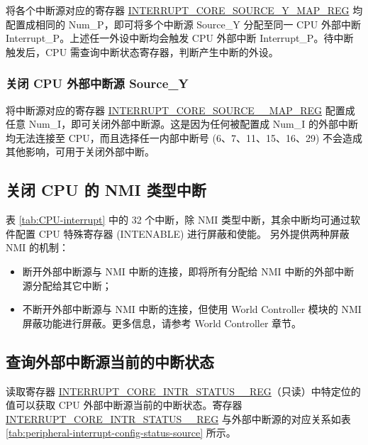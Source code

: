 \documentclass[main\_\_CN.tex]{subfiles}
\begin{document}
将各个中断源对应的寄存器 \hyperref[regdesc:INTERRUPTCORE0CACHECORE1ACSINTMAPREG]{INTERRUPT\_CORE\_SOURCE\_Y\_MAP\_REG} 均配置成相同的 Num\_P，即可将多个中断源 Source\_Y 分配至同一 CPU 外部中断 Interrupt\_P。上述任一外设中断均会触发 CPU 外部中断 Interrupt\_P。待中断触发后，CPU 需查询中断状态寄存器，判断产生中断的外设。

\subsubsection{关闭 CPU 外部中断源 Source\_Y}

将中断源对应的寄存器 \hyperref[regdesc:INTERRUPTCORE0CACHECORE1ACSINTMAPREG]{INTERRUPT\_CORE\_SOURCE\_\_MAP\_REG} 配置成任意 Num\_I，即可关闭外部中断源。这是因为任何被配置成 Num\_I 的外部中断均无法连接至 CPU，而且选择任一内部中断号 (6、7、11、15、16、29) 不会造成其他影响，可用于关闭外部中断。

\subsection{关闭 CPU 的 NMI 类型中断}

表 \ref{tab:CPU-interrupt} 中的 32 个中断，除 NMI 类型中断，其余中断均可通过软件配置 CPU 特殊寄存器 (INTENABLE) 进行屏蔽和使能。\chipname{} 另外提供两种屏蔽 NMI 的机制：
\begin{itemize}
\item 断开外部中断源与 NMI 中断的连接，即将所有分配给 NMI 中断的外部中断源分配给其它中断；
\item 不断开外部中断源与 NMI 中断的连接，但使用 World Controller 模块的 NMI 屏蔽功能进行屏蔽。更多信息，请参考 World Controller 章节。
\end{itemize}

\subsection{查询外部中断源当前的中断状态}

读取寄存器 \hyperref[regdesc:INTERRUPTCORE0INTRSTATUS0REG]{INTERRUPT\_CORE\_INTR\_STATUS\_\_REG}（只读）中特定位的值可以获取 CPU 外部中断源当前的中断状态。寄存器 \hyperref[regdesc:INTERRUPTCORE0INTRSTATUS0REG]{INTERRUPT\_CORE\_INTR\_STATUS\_\_REG} 与外部中断源的对应关系如表 \ref{tab:peripheral-interrupt-config-status-source} 所示。
\end{document}
